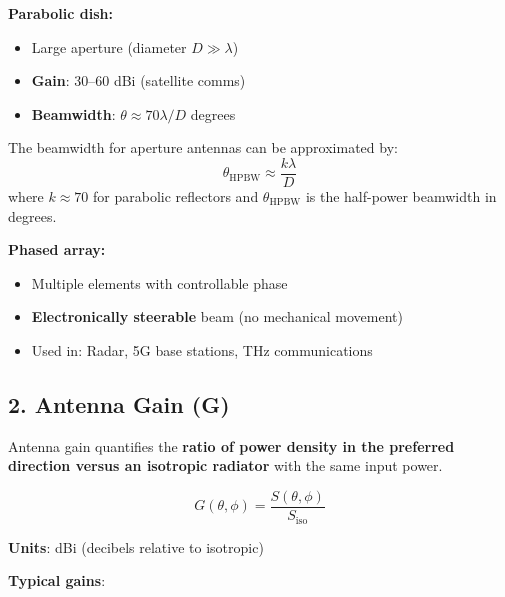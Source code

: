 \textbf{Parabolic dish:}
\begin{itemize}
\item Large aperture (diameter $D \gg \lambda$)
\item \textbf{Gain}: 30--60 dBi (satellite comms)
\item \textbf{Beamwidth}: $\theta \approx 70\lambda/D$ degrees
\end{itemize}

The beamwidth for aperture antennas can be approximated by:
\begin{equation}
\theta_{\text{HPBW}} \approx \frac{k\lambda}{D}
\label{eq:aperture-beamwidth}
\end{equation}
where $k \approx 70$ for parabolic reflectors and $\theta_{\text{HPBW}}$ is the half-power beamwidth in degrees.

\textbf{Phased array:}
\begin{itemize}
\item Multiple elements with controllable phase
\item \textbf{Electronically steerable} beam (no mechanical movement)
\item Used in: Radar, 5G base stations, THz communications
\end{itemize}

\subsection{2. Antenna Gain (G)}

Antenna gain quantifies the \textbf{ratio of power density in the preferred direction versus an isotropic radiator} with the same input power.

\begin{equation}
G(\theta, \phi) = \frac{S(\theta, \phi)}{S_{\text{iso}}}
\label{eq:antenna-gain}
\end{equation}

\textbf{Units}: dBi (decibels relative to isotropic)

\textbf{Typical gains}:

